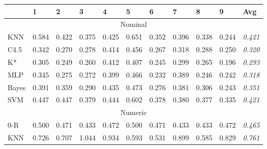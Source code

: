 \documentclass[../thesis/thesis.tex]{subfiles}
\begin{document}
\begin{landscape}
\begin{table}
\centering
\begin{tabular}{|l|l|l|l|l|l|l|l|l|l|l|}
\hline
        & \textbf{1}     & \textbf{2}     & \textbf{3}     & \textbf{4}     & \textbf{5}     & \textbf{6}     & \textbf{7}     & \textbf{8}     & \textbf{9}     & \textbf{Avg}   \\ \hline
\multicolumn{11}{|c|}{Nominal}                                                                                                                                                    \\ \hline
KNN     & 0.584          & 0.422          & 0.375          & 0.425          & 0.651          & 0.352          & 0.396          & 0.338          & 0.244          & \textit{0.421} \\ \hline
C4.5    & 0.342          & 0.270          & 0.278          & 0.414          & 0.456          & 0.267          & 0.318          & 0.288          & 0.250          & \textit{0.320} \\ \hline
K*      & 0.305          & 0.249          & 0.260          & 0.412          & 0.407          & 0.245          & 0.299          & 0.265          & 0.196          & \textit{0.293} \\ \hline
MLP     & 0.345          & 0.275          & 0.272          & 0.399          & 0.466          & 0.232          & 0.389          & 0.246          & 0.242          & \textit{0.318} \\ \hline
Bayes   & 0.391          & 0.359          & 0.290          & 0.435          & 0.473          & 0.276          & 0.381          & 0.306          & 0.243          & \textit{0.351} \\ \hline
SVM     & 0.447          & 0.447          & 0.379          & 0.444          & 0.602          & 0.378          & 0.380          & 0.377          & 0.335          & \textit{0.421} \\ \hline
\multicolumn{11}{|c|}{Numeric}                                                                                                                                                    \\ \hline
0-R     & 0.500          & 0.471          & 0.433          & 0.472          & 0.500          & 0.471          & 0.433          & 0.433          & 0.472          & \textit{0.465} \\ \hline
KNN     & 0.726          & 0.707          & 1.044          & 0.934          & 0.593          & 0.531          & 0.899          & 0.585          & 0.829          & \textit{0.761} \\ \hline

\end{tabular}
\end{table}
\end{landscape}
\end{document}
